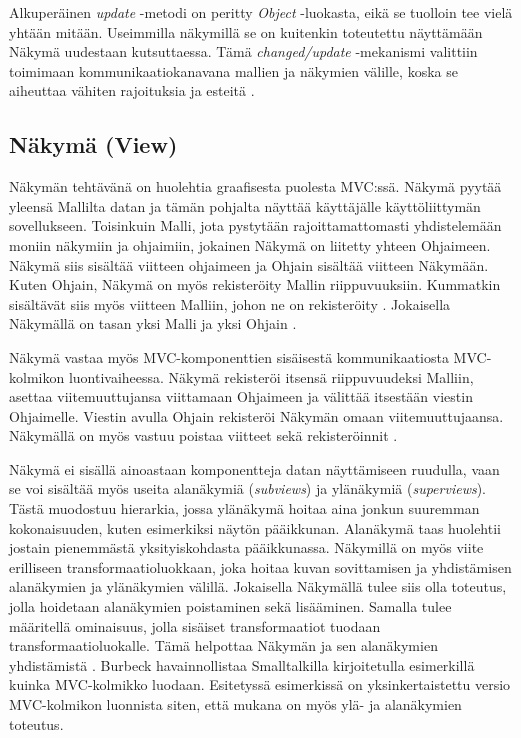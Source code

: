 \documentclass[utf8]{gradu3}
\begin{document}
Alkuperäinen \textit{update} -metodi on peritty \textit{Object} -luokasta, eikä se tuolloin tee vielä yhtään mitään. Useimmilla näkymillä se on kuitenkin toteutettu näyttämään Näkymä uudestaan kutsuttaessa. Tämä \textit{changed/update} -mekanismi valittiin toimimaan kommunikaatiokanavana mallien ja näkymien välille, koska se aiheuttaa vähiten rajoituksia ja esteitä \parencite{burbeck}. 

\subsection{Näkymä (View)}
Näkymän tehtävänä on huolehtia graafisesta puolesta MVC:ssä. Näkymä pyytää yleensä Mallilta datan ja tämän pohjalta näyttää käyttäjälle käyttöliittymän sovellukseen. Toisinkuin Malli, jota pystytään rajoittamattomasti yhdistelemään moniin näkymiin ja ohjaimiin, jokainen Näkymä on liitetty yhteen Ohjaimeen.  Näkymä siis sisältää viitteen ohjaimeen ja Ohjain sisältää viitteen Näkymään. Kuten Ohjain, Näkymä on myös rekisteröity Mallin riippuvuuksiin. Kummatkin sisältävät siis myös viitteen Malliin, johon ne on rekisteröity \parencite{burbeck}. Jokaisella Näkymällä on tasan yksi Malli ja yksi Ohjain \parencite[s. 7]{krasner_desc}.

Näkymä vastaa myös MVC-komponenttien sisäisestä kommunikaatiosta MVC-kolmikon luontivaiheessa. Näkymä rekisteröi itsensä riippuvuudeksi Malliin, asettaa viitemuuttujansa viittamaan Ohjaimeen ja välittää itsestään viestin Ohjaimelle. Viestin avulla Ohjain rekisteröi Näkymän omaan viitemuuttujaansa. Näkymällä on myös vastuu poistaa viitteet sekä rekisteröinnit \parencite{burbeck}. 

Näkymä ei sisällä ainoastaan komponentteja datan näyttämiseen ruudulla, vaan se voi sisältää myös useita alanäkymiä (\emph{subviews}) ja ylänäkymiä (\emph{superviews}). Tästä muodostuu hierarkia, jossa ylänäkymä hoitaa aina jonkun suuremman kokonaisuuden, kuten esimerkiksi näytön pääikkunan. Alanäkymä taas huolehtii jostain pienemmästä yksityiskohdasta pääikkunassa. Näkymillä on myös viite erilliseen transformaatioluokkaan, joka hoitaa kuvan sovittamisen ja yhdistämisen alanäkymien ja ylänäkymien välillä. Jokaisella Näkymällä tulee siis olla toteutus, jolla hoidetaan alanäkymien poistaminen sekä lisääminen. Samalla tulee määritellä ominaisuus, jolla sisäiset transformaatiot tuodaan transformaatioluokalle. Tämä helpottaa Näkymän ja sen alanäkymien yhdistämistä \parencite[s. 8]{krasner_desc}. Burbeck havainnollistaa Smalltalkilla kirjoitetulla esimerkillä kuinka MVC-kolmikko luodaan. Esitetyssä esimerkissä on yksinkertaistettu versio MVC-kolmikon luonnista siten, että mukana on myös ylä- ja alanäkymien toteutus.
\end{document}
